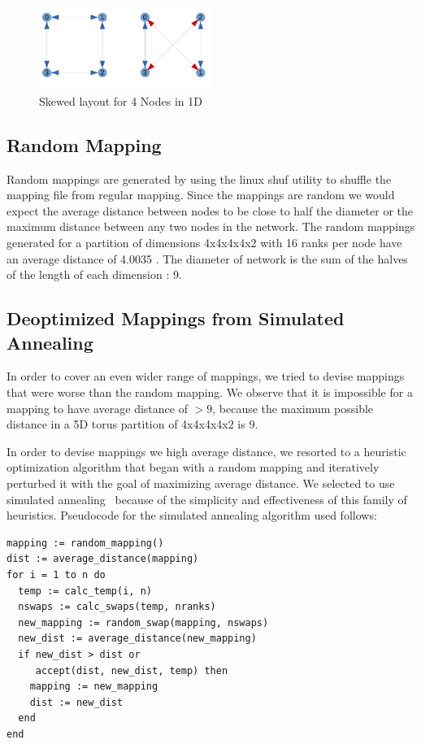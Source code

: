 \documentclass{acm_proc_article-sp}
\begin{document}
\label{sect:Skewed mapping in 1D}
\begin{figure}
  \center
  \includegraphics[width=0.5\textwidth]{skewed_layout_cropped.pdf}
  \caption{Skewed layout for 4 Nodes in 1D}
    \label{fig:Skewed layout for 4 Nodes in 1D}
\end{figure}

\subsection{Random Mapping}

Random mappings are generated by using the linux shuf utility to shuffle the mapping file from regular mapping.
Since the mappings are random we would expect the average distance between nodes to be close to half the diameter
or the maximum distance between any two nodes in the network. The random mappings generated for a partition of
dimensions 4x4x4x4x2 with 16 ranks per node have an average distance of 4.0035 .
The diameter of network is the sum of the halves of the length of each dimension : 9.



\subsection{Deoptimized Mappings from Simulated Annealing}
In order to cover an even wider range of mappings, we tried to
devise mappings that were worse than the random mapping.
We observe that it is impossible for a mapping to have
average distance of $>9$, because the maximum possible distance
in a 5D torus partition of 4x4x4x4x2 is 9.

In order to devise mappings we high average distance, we resorted
to a heuristic optimization algorithm that began with a random mapping
and iteratively perturbed it with the goal of maximizing average distance.  
We selected to use simulated annealing~\cite{Press2007} because of the
simplicity and effectiveness of this family of heuristics.
Pseudocode for the simulated annealing algorithm used follows:

\begin{lstlisting}[basicstyle=\ttfamily,columns=fixed]
mapping := random_mapping()
dist := average_distance(mapping)
for i = 1 to n do
  temp := calc_temp(i, n)
  nswaps := calc_swaps(temp, nranks)
  new_mapping := random_swap(mapping, nswaps)
  new_dist := average_distance(new_mapping)
  if new_dist > dist or 
     accept(dist, new_dist, temp) then
    mapping := new_mapping
    dist := new_dist
  end
end
\end{lstlisting}
\end{document}
